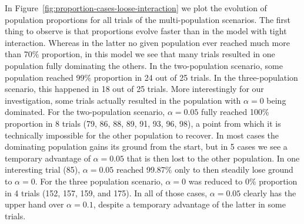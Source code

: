 \documentclass[a4paper]{article}
\begin{document}
In Figure~\ref{fig:proportion-cases-loose-interaction} we plot the evolution of population proportions for all trials of the multi-population scenarios.
The first thing to observe is that proportions evolve faster than in the model with tight interaction.
Whereas in the latter no given population ever reached much more than 70\% proportion, in this model we see that many trials resulted in one population fully dominating the others.
In the two-population scenario, some population reached 99\% proportion in 24 out of 25 trials.
In the three-population scenario, this happened in 18 out of 25 trials.
More interestingly for our investigation, some trials actually resulted in the population with $\alpha = 0$ being dominated.
For the two-population scenario, $\alpha = 0.05$ fully reached 100\% proportion in 8 trials (79, 86, 88, 89, 91, 93, 96, 98), a point from which it is technically impossible for the other population to recover.
In most cases the dominating population gains its ground from the start, but in 5 cases we see a temporary advantage of $\alpha = 0.05$ that is then lost to the other population.
In one interesting trial (85), $\alpha = 0.05$ reached 99.87\% only to then steadily lose ground to $\alpha = 0$.
For the three population scenario, $\alpha = 0$ was reduced to 0\% proportion in 4 trials (152, 157, 159, and 175).
In all of those cases, $\alpha = 0.05$ clearly has the upper hand over $\alpha = 0.1$, despite a temporary advantage of the latter in some trials.
\end{document}
